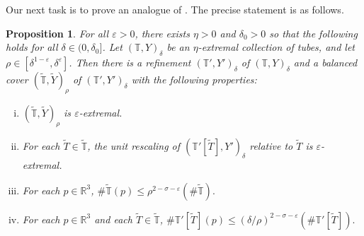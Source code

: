 \documentclass[letterpaper, reqno,11pt]{article}
\numberwithin{equation}{section}
\newcommand{\RR}{\mathbb{R}}
\newcommand{\TT}{\mathbb{T}}
\newcommand{\eps}{\varepsilon}
\numberwithin{thm}{section}
\newtheorem{prop}[thm]{Proposition}
\theoremstyle{remark}
\begin{document}
Our next task is to prove an analogue of \cite[Proposition 3.2]{WZ}. The precise statement is as follows. 

\begin{prop}\label{prop: sticky}
    For all $\eps>0$, there exists $\eta>0$ and $\delta_0>0$ so that the following holds for all $\delta\in (0,\delta_0]$.  Let $(\TT, Y)_{\delta}$ be an $\eta$-extremal collection of tubes, and let $\rho\in [\delta^{1-\eps}, \delta^{\eps}]$. Then there is a refinement $(\TT', Y')_{\delta}$ of $(\TT, Y)_{\delta}$ and a balanced cover $(\tilde{\TT}, \tilde{Y})_{\rho}$ of $(\TT', Y')_{\delta}$ with the following properties: 
    \begin{enumerate}[(i)]
        \item  \label{it: i} $(\tilde{\TT}, \tilde{Y})_{\rho}$ is $\eps$-extremal.
        \item  \label{it: ii} For each $\tilde{T}\in \tilde{\TT}$, the unit rescaling  of $(\TT'[\tilde{T}], Y')_{\delta}$ relative  to $\tilde{T}$ is $\eps$-extremal.
        \item  \label{it: iii} For each $p\in \RR^3$, $\# \tilde{\TT}(p) \leq \rho^{2-\sigma-\eps} (\#\tilde{\TT}).$
        \item  \label{it: iv} For each $p\in \RR^3$ and each $\tilde{T}\in \tilde{\TT}$, $\# \TT'[\tilde{T}](p) \leq (\delta/\rho)^{2-\sigma-\eps} (\# \TT'[\tilde{T}]).$
    \end{enumerate}
\end{prop}
\end{document}
